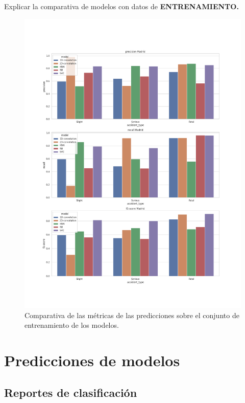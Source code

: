     Explicar la comparativa de modelos con datos de \textbf{ENTRENAMIENTO.}


    \begin{figure}[h]
        \centering
        \includegraphics[width=16cm]{archivos/5.Resultados/ComparativaTrain}
        \caption{Comparativa de las métricas de las predicciones sobre el conjunto de entrenamiento de los modelos.}
        \label{ResultsTrainImage}
     \end{figure}



\section{Predicciones de modelos}

  \subsection{Reportes de clasificación}

